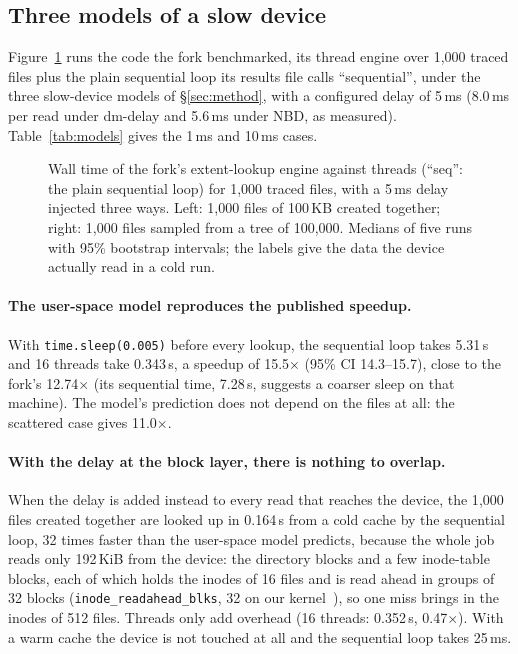 \subsection{Three models of a slow device}
\label{sec:models}

Figure~\ref{fig:models} runs the code the fork benchmarked, its thread engine over
1{,}000 traced files plus the plain sequential loop its results file calls
``sequential'', under the three slow-device models of \S\ref{sec:method}, with a
configured delay of 5\,ms (8.0\,ms per read under dm-delay and 5.6\,ms under NBD, as
measured). Table~\ref{tab:models} gives the 1\,ms and 10\,ms cases.

\begin{figure}[t]
\centering
{}
\caption{Wall time of the fork's extent-lookup engine against threads (``seq'': the
plain sequential loop) for 1{,}000 traced files, with a 5\,ms delay injected three
ways. Left: 1{,}000 files of 100\,KB created together; right: 1{,}000 files sampled
from a tree of 100{,}000. Medians of five runs with 95\% bootstrap intervals; the
labels give the data the device actually read in a cold run.}
\label{fig:models}
\end{figure}

\paragraph{The user-space model reproduces the published speedup.} With
\texttt{time.sleep(0.005)} before every lookup, the sequential loop takes 5.31\,s and
16 threads take 0.343\,s, a speedup of 15.5$\times$ (95\% CI 14.3--15.7), close to the
fork's 12.74$\times$ (its sequential time, 7.28\,s, suggests a coarser sleep on that
machine). The model's prediction does not depend on the files at all: the scattered
case gives 11.0$\times$.

\paragraph{With the delay at the block layer, there is nothing to overlap.} When the
delay is added instead to every read that reaches the device, the 1{,}000 files created
together are looked up in 0.164\,s from a cold cache by the sequential loop, 32 times
faster than the user-space model predicts, because the whole job reads only 192\,KiB
from the device: the directory blocks and a few inode-table blocks, each of which
holds the inodes of 16 files and is read ahead in groups of 32 blocks
(\texttt{inode\_readahead\_blks}, 32 on our kernel~\cite{kernelext4admin}), so one
miss brings in the inodes of 512 files.
Threads only add overhead (16 threads: 0.352\,s, 0.47$\times$). With a warm cache the
device is not touched at all and the sequential loop takes 25\,ms.

